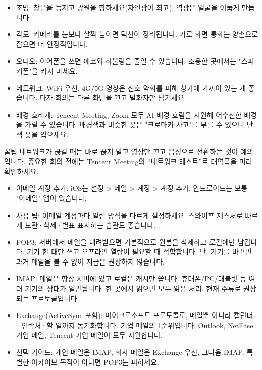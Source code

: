 \begin{itemize}
  \item 조명: 창문을 등지고 광원을 향하세요(자연광이 최고). 역광은 얼굴을 어둡게 만듭니다.
  \item 각도: 카메라를 눈보다 살짝 높이면 턱선이 정리됩니다. 가로 화면 통화는 양손으로 잡으면 더 안정적입니다.
  \item 오디오: 이어폰을 쓰면 에코와 하울링을 줄일 수 있습니다. 조용한 곳에서는 "스피커폰"을 켜지 마세요.
  \item 네트워크: WiFi 우선. 4G/5G 영상은 신호 약화를 피해 창가에 가까이 있는 게 좋습니다. 다자 회의는 다른 화면을 끄고 발화자만 남기세요.
  \item 배경 흐리게: Tencent Meeting, Zoom 모두 AI 배경 흐림을 지원해 어수선한 배경을 가릴 수 있습니다. 배경색과 비슷한 옷은 "크로마키 사고"를 부를 수 있으니 단색 옷을 입으세요.
\end{itemize}

\begin{tcbinfo}{꿀팁}
네트워크가 끊길 때는 바로 끊지 말고 영상만 끄고 음성으로 전환하는 것이 예의입니다. 중요한 회의 전에는 Tencent Meeting의 “네트워크 테스트”로 대역폭을 미리 확인하세요.

\end{tcbinfo}


\begin{itemize}
  \item 이메일 계정 추가: iOS는 설정 > 메일 > 계정 > 계정 추가, 안드로이드는 보통 "이메일" 앱이 있습니다.
  \item 사용 팁: 이메일 계정마다 알림 방식을 다르게 설정하세요. 스와이프 제스처로 빠르게 보관·삭제·별표 표시하는 습관도 좋습니다.
\end{itemize}


\begin{itemize}
  \item POP3: 서버에서 메일을 내려받으면 기본적으로 원본을 삭제하고 로컬에만 남깁니다. 기기 한 대만 쓰고 오프라인 열람이 필요할 때 적합합니다. 단, 기기를 바꾸면 과거 메일을 볼 수 없어 지금은 권장하지 않습니다.
  \item IMAP: 메일은 항상 서버에 있고 로컬은 캐시만 씁니다. 휴대폰/PC/태블릿 등 여러 기기의 상태가 일관됩니다. 한 곳에서 읽으면 모두 읽음 처리. 현재 주류로 권장되는 프로토콜입니다.
  \item Exchange(ActiveSync 포함): 마이크로소프트 프로토콜로, 메일뿐 아니라 캘린더·연락처·할 일까지 동기화합니다. 기업 메일의 1순위입니다. Outlook, NetEase 기업 메일, Tencent 기업 메일이 모두 지원합니다.
  \item 선택 가이드: 개인 메일은 IMAP, 회사 메일은 Exchange 우선, 그다음 IMAP. 특별한 아카이브 목적이 아니면 POP3는 피하세요.
\end{itemize}

